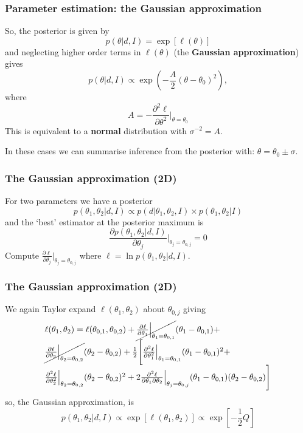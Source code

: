 \begin{frame}

\frametitle{Parameter estimation: the Gaussian approximation}
\label{parameterestimation:thegaussianapproximation}

So, the posterior is given by
\[
p(\theta|d,I) = \exp{[\ell(\theta)]}
\]
and neglecting higher order terms in $\ell(\theta)$ (the \textbf{Gaussian approximation}) gives
\[
p(\theta|d,I) \propto \exp{\left(-\frac{A}{2}(\theta - \theta_0)^2\right)},
\]
where
\[
A = -\frac{\partial^2 \ell}{\partial \theta^2}\Bigg|_{\theta=\theta_0}
\]
This is equivalent to a \textbf{normal} distribution with $\sigma^{-2} = A$.

In these cases we can summarise inference from the posterior with: $\theta = \theta_0 \pm \sigma$.

\end{frame}

\begin{frame}

\frametitle{The Gaussian approximation (2D)}
\label{thegaussianapproximation2d}

For two parameters we have a posterior
\[
p(\theta_1,\theta_2|d,I) \propto p(d|\theta_1,\theta_2,I) \times p(\theta_1,\theta_2|I)
\]
and the `best' estimator at the posterior maximum is
\[
\frac{\partial p(\theta_1,\theta_2|d,I)}{\partial \theta_j}\Bigg|_{\theta_j=\theta_{0,j}} = 0
\]
Compute $\frac{\partial \ell}{\partial \theta_j}\big|_{\theta_j=\theta_{0,j}}$ where $\ell = \ln{p(\theta_1,\theta_2|d,I)}$.

\end{frame}

\begin{frame}

\frametitle{The Gaussian approximation (2D)}
\label{thegaussianapproximation2d}

We again Taylor expand $\ell(\theta_1,\theta_2)$ about $\theta_{0,j}$ giving
\[
\begin{array}{l}
\ell(\theta_1,\theta_2) = \ell(\theta_{0,1},\theta_{0,2}) + \cancel{\frac{\partial \ell}{\partial \theta_1}\Big|_{\theta_1=\theta_{0,1}}}(\theta_1-\theta_{0,1}) + \\
\cancel{\frac{\partial \ell}{\partial \theta_2}\Big|_{\theta_2=\theta_{0,2}}}(\theta_2-\theta_{0,2}) + 
\frac{1}{2}\Bigg[ \frac{\partial^2 \ell}{\partial \theta^2_1}\Big|_{\theta_1=\theta_{0,1}}(\theta_1-\theta_{0,1})^2 + 
\\
\frac{\partial^2 \ell}{\partial \theta^2_2}\Big|_{\theta_2=\theta_{0,2}}(\theta_2-\theta_{0,2})^2 +
 2\frac{\partial^2 \ell}{\partial \theta_1 \partial \theta_2}\Big|_{\theta_j=\theta_{0,j}}(\theta_1-\theta_{0,1})(\theta_2 - \theta_{0,2})\Bigg]
\end{array}
\]
so, the Gaussian approximation, is
\[
p(\theta_1,\theta_2|d,I) \propto \exp{[\ell(\theta_1,\theta_2)]} \propto \exp{\left[-\frac{1}{2}Q\right]}
\]

\end{frame}

